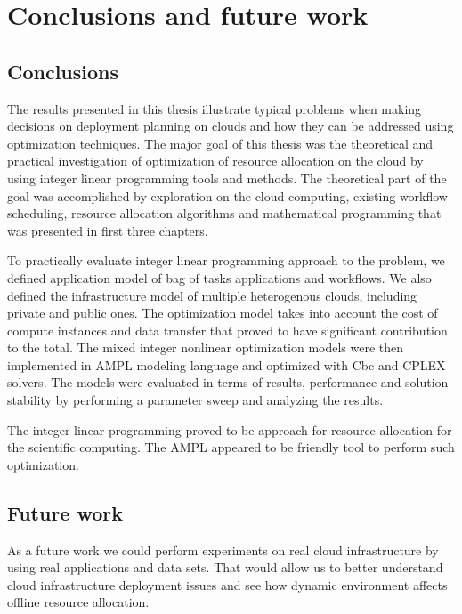 \chapter{Conclusions and future work}
\label{chap:conclusions} 

\section{Conclusions}

The results presented in this thesis illustrate typical problems when making decisions on deployment planning on clouds and how they can be addressed using optimization techniques. The major goal of this thesis was the theoretical and practical investigation of optimization of resource allocation on the cloud by using integer linear programming tools and methods. The theoretical part of the goal was accomplished by exploration on the cloud computing, existing workflow scheduling, resource allocation algorithms and mathematical programming that was presented in first three chapters. 

To practically evaluate integer linear programming approach to the problem, we defined application model of bag of tasks applications and workflows. We also defined the infrastructure model of multiple heterogenous clouds, including private and public ones. The optimization model takes into account the cost of compute instances and data transfer that proved to have significant contribution to the total. The mixed integer nonlinear optimization models were then implemented in AMPL modeling language and optimized with Cbc and CPLEX solvers. The models were evaluated in terms of results, performance and solution stability by performing a parameter sweep and analyzing the results. 

The integer linear programming proved to be approach for resource allocation for the scientific computing. The AMPL appeared to be friendly tool to perform such optimization.

\section{Future work}

As a future work we could perform experiments on real cloud infrastructure by using real applications and data sets. That would allow us to better understand cloud infrastructure deployment issues and see how dynamic environment affects offline resource allocation.

